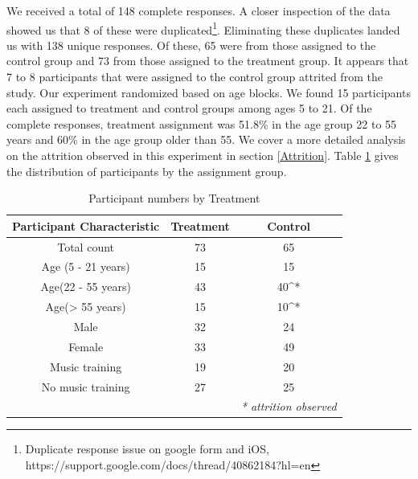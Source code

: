 \documentclass[journal,onecolumn, 12pt]{article}
\begin{document}
We received a total of 148 complete responses. A closer inspection of the data showed us that 8 of these were duplicated\footnote {Duplicate response issue on google form and iOS, https://support.google.com/docs/thread/40862184?hl=en}. Eliminating these duplicates landed us with 138 unique responses. Of these, 65 were from those assigned to the control group and 73 from those assigned to the treatment group. It appears that 7 to 8 participants that were assigned to the control group attrited from the study. Our experiment randomized based on age blocks. We found 15 participants each assigned to treatment and control groups among ages 5 to 21. Of the complete responses, treatment assignment was 51.8\% in the age group 22 to 55 years and 60\% in the age group older than 55. We cover a more detailed analysis on the attrition observed in this experiment in section \ref{Attrition}. Table \ref{table: numbers} gives the distribution of participants by the assignment group.\\

\begin{table}[h]
\begin{center}
 \begin{tabular}{||c | c c ||} 
 \hline
 Participant Characteristic & Treatment & Control \\  
 \hline\hline
 Total count & 73 & 65 \\ \hline
 Age (5 - 21 years) & 15 & 15 \\ 
 Age(22 - 55 years) & 43 & 40^* \\ 
 Age(> 55 years) & 15 & 10^* \\ \hline
 Male & 32 & 24 \\ 
 Female & 33 & 49 \\ \hline
 Music training & 19 & 20 \\ 
 No music training & 27 & 25 \\ 
 & & \textit{* attrition observed} \\ \hline
 \end{tabular}
\caption{Participant numbers by Treatment}
\label{table: numbers}
\end{center}
\end{table}
\end{document}
